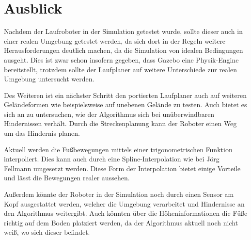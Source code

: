 \chapter{Ausblick}
\label{kap7}

Nachdem der Laufroboter in der Simulation getestet wurde, sollte dieser auch in einer realen Umgebung getestet werden, da sich dort in der Regeln weitere Herausforderungen deutlich machen, da die Simulation von idealen Bedingungen ausgeht. Dies ist zwar schon insofern gegeben, dass Gazebo eine Physik-Engine bereitstellt, trotzdem sollte der Laufplaner auf weitere Unterschiede zur realen Umgebung untersucht werden.

Des Weiteren ist ein nächster Schritt den portierten Laufplaner auch auf weiteren Geländeformen wie beispielsweise auf unebenen Gelände zu testen.  Auch bietet es sich an zu untersuchen, wie der Algorithmus sich bei unüberwindbaren Hindernissen verhält. Durch die Streckenplanung kann der Roboter einen Weg um das Hindernis planen.

Aktuell werden die Fußbewegungen mittels einer trigonometrischen Funktion interpoliert. Dies kann auch durch eine Spline-Interpolation wie bei Jörg Fellmann \autocite{fellmann2007} umgesetzt werden. Diese Form der Interpolation bietet einige Vorteile und lässt die Bewegungen realer aussehen.

Außerdem könnte der Roboter in der Simulation noch durch einen Sensor am Kopf ausgestattet werden, welcher die Umgebung verarbeitet und Hindernisse an den Algorithmus weitergibt. Auch könnten über die Höheninformationen die Füße richtig auf dem Boden platziert werden, da der Algorithmus aktuell noch nicht weiß, wo sich dieser befindet.